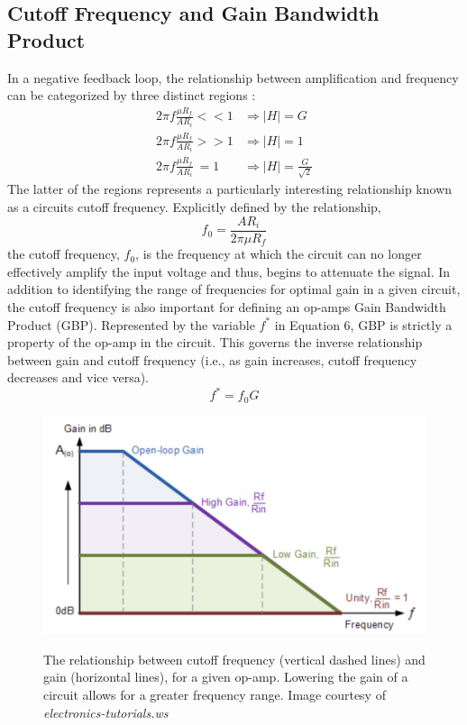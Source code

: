 \documentclass[letterpaper,12pt]{article}
\begin{document}
\subsection{Cutoff Frequency and Gain Bandwidth Product}
In a negative feedback loop, the relationship between amplification and frequency can be categorized by three distinct regions :
\begin{align*}
    2 \pi f \frac{\mu R_f}{A R_i} << 1 &  \Rightarrow |H| = G \\
    2 \pi f \frac{\mu R_f}{A R_i} >> 1 &  \Rightarrow |H| = 1 \\
    2 \pi f \frac{\mu R_f}{A R_i} \ =1 &  \Rightarrow |H| = \frac{G}{\sqrt{2}}
\end{align*}
The latter of the regions represents a particularly interesting relationship known as a circuits cutoff frequency. Explicitly defined by the relationship,
\begin{equation}
    \label{cutoff}
    f_0 = \frac{A R_i}{2\pi \mu R_f}
\end{equation}
the cutoff frequency, $f_0$, is the frequency at which the circuit can no longer effectively amplify the input voltage and thus, begins to attenuate the signal. In addition to identifying the range of frequencies for optimal gain in a given circuit, the cutoff frequency is also important for defining an op-amps Gain Bandwidth Product (GBP). Represented by the variable $f^*$ in Equation 6, GBP is strictly a property of the op-amp in the circuit. This governs the inverse relationship between gain and cutoff frequency (i.e., as gain increases, cutoff frequency decreases and vice versa).
\begin{equation}
    \label{GBP}
    f^* = f_0G
\end{equation}

\begin{figure}[ht]
    \centering
    \includegraphics[scale = .5]{GBPpic.png}
    \label{GBPpic}
    \caption{\small The relationship between cutoff frequency (vertical dashed lines) and gain (horizontal lines), for a given op-amp. Lowering the gain of a circuit allows for a greater frequency range. Image courtesy of \textit{electronics-tutorials.ws}}
\end{figure}
\end{document}
